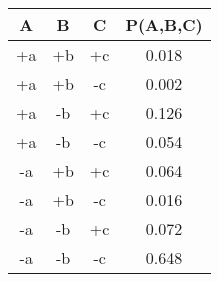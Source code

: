 \documentclass[12pt]{article}
\begin{document}
\begin{center}
\begin{tabular}{|c|c|c|c|} \hline
A  & B  & C  & P(A,B,C) \\ \hline
+a & +b & +c & 0.018    \\ \hline
+a & +b & -c & 0.002    \\ \hline
+a & -b & +c & 0.126    \\ \hline
+a & -b & -c & 0.054    \\ \hline
-a & +b & +c & 0.064    \\ \hline
-a & +b & -c & 0.016    \\ \hline
-a & -b & +c & 0.072    \\ \hline
-a & -b & -c & 0.648    \\ \hline
\end{tabular}
\end{center}
\end{document}
